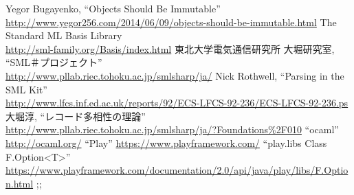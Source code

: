 \documentclass[11pt,a4paper]{article}
\begin{document}
\begin{thebibliography}{9}
   Yegor Bugayenko, ``Objects Should Be Immutable''\\
    \url{http://www.yegor256.com/2014/06/09/objects-should-be-immutable.html}
   The Standard ML Basis Library \\
    \url{http://sml-family.org/Basis/index.html}
   東北大学電気通信研究所 大堀研究室, ``SML＃プロジェクト''\\
    \url{http://www.pllab.riec.tohoku.ac.jp/smlsharp/ja/}
   Nick Rothwell, ``Parsing in the SML Kit'' \\
    \url{http://www.lfcs.inf.ed.ac.uk/reports/92/ECS-LFCS-92-236/ECS-LFCS-92-236.ps}
   大堀淳, ``レコード多相性の理論''
    \url{http://www.pllab.riec.tohoku.ac.jp/smlsharp/ja/?Foundations%2F010}
   ``ocaml''
    \url{http://ocaml.org/}
   ``Play''
    \url{https://www.playframework.com/}
   ``play.libs Class F.Option<T>''
    \url{https://www.playframework.com/documentation/2.0/api/java/play/libs/F.Option.html}
;;
\end{thebibliography}
\end{document}
